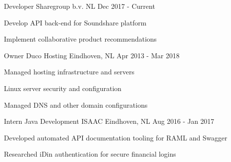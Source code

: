 \vspace{2mm}

\begin{cventries}
\cventry
  {Developer} %
  {Sharegroup b.v.} %
  {NL} %
  {Dec 2017 - Current} %
  {
    \begin{cvitems} %
      \item {Develop API back-end for Soundshare platform}
      \item {Implement collaborative product recommendations}
    \end{cvitems}
  }
  \vspace{4mm}
  
\cventry
  {Owner} %
  {Duco Hosting} %
  {Eindhoven, NL} %
  {Apr 2013 - Mar 2018} %
  {
    \begin{cvitems} %
      \item {Managed hosting infrastructure and servers}
      \item {Linux server security and configuration}
      \item {Managed DNS and other domain configurations}
    \end{cvitems}
  }
  \vspace{4mm}

  \cventry
    {Intern Java Development} %
    {ISAAC} %
    {Eindhoven, NL} %
    {Aug 2016 - Jan 2017} %
    {
      \begin{cvitems} %
        \item {Developed automated API documentation tooling for RAML and Swagger}
        \item {Researched iDin authentication for secure financial logins}
      \end{cvitems}
    }
    \vspace{4mm}


\end{cventries}
